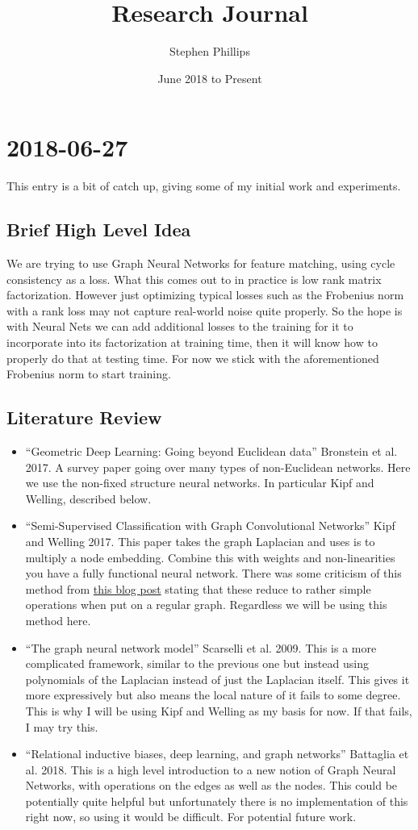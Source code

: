 \documentclass[a4paper]{article}
\title{Research Journal}
\author{Stephen Phillips}
\date{June 2018 to Present}
\newcommand{\DatestampYMD}[3]{\mbox{#1-#2-#3}}
\newcommand{\entry}[3]{\newpage\section*{\DatestampYMD{#1}{#2}{#3}} }
\begin{document}
\maketitle

\entry{2018}{06}{27}
This entry is a bit of catch up, giving some of my initial work and experiments.
\subsection*{Brief High Level Idea}
We are trying to use Graph Neural Networks for feature matching, using cycle consistency as a loss.
What this comes out to in practice is low rank matrix factorization.
However just optimizing typical losses such as the Frobenius norm with a rank loss may not capture real-world noise quite properly.
So the hope is with Neural Nets we can add additional losses to the training for it to incorporate into its factorization at training time, then it will know how to properly do that at testing time.
For now we stick with the aforementioned Frobenius norm to start training.

\subsection*{Literature Review}
\begin{itemize}
\item ``Geometric Deep Learning: Going beyond Euclidean data'' Bronstein et al. 2017.
A survey paper going over many types of non-Euclidean networks.
Here we use the non-fixed structure neural networks.
In particular Kipf and Welling, described below.
\item ``Semi-Supervised Classification with Graph Convolutional Networks'' Kipf and Welling 2017.
This paper takes the graph Laplacian and uses is to multiply a node embedding.
Combine this with weights and non-linearities you have a fully functional neural network.
There was some criticism of this method from \href{https://www.inference.vc/how-powerful-are-graph-convolutions-review-of-kipf-welling-2016-2/}{this blog post} stating that these reduce to rather simple operations when put on a regular graph.
Regardless we will be using this method here.
\item ``The graph neural network model'' Scarselli et al. 2009.
This is a more complicated framework, similar to the previous one but instead using polynomials of the Laplacian instead of just the Laplacian itself.
This gives it more expressively but also means the local nature of it fails to some degree.
This is why I will be using Kipf and Welling as my basis for now.
If that fails, I may try this.
\item ``Relational inductive biases, deep learning, and graph networks'' Battaglia et al. 2018.
This is a high level introduction to a new notion of Graph Neural Networks, with operations on the edges as well as the nodes.
This could be potentially quite helpful but unfortunately there is no implementation of this right now, so using it would be difficult.
For potential future work.
\end{itemize}
\end{document}
